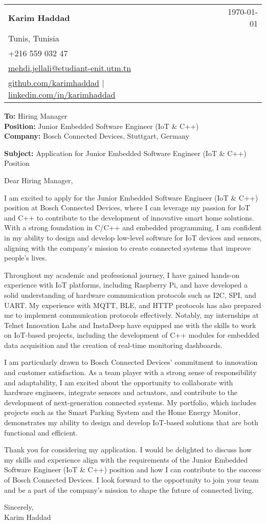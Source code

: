 \documentclass[letterpaper,11pt]{article}
\makeatletter
\newcommand{\letterHeading}[5]{
    \begin{tabular*}{\textwidth}{l@{\extracolsep{\fill}}r}
    \textbf{\Large #1} & #5 \\  %
    #2 & \\
    #3 & \\
    #4 & \\
    \end{tabular*}
    \vspace{15pt}
}
\newcommand{\letterRecipient}[3]{
    \textbf{\large To:} #1 \\
    \textbf{\large Position:} #2 \\
    \textbf{\large Company:} #3 \\
    \vspace{12pt}
}
\newcommand{\letterSubject}[1]{
    \textbf{\large Subject:} #1 \\
    \vspace{15pt}
}
\makeatother
\begin{document}
    \letterHeading
    {Karim Haddad}
    {Tunis, Tunisia}
    {+216 559 032 47 \\ \href{mailto:mehdi.jellali@etudiant-enit.utm.tn}{mehdi.jellali@etudiant-enit.utm.tn}}
    {\href{https://github.com/karimhaddad}{github.com/karimhaddad} $|$ \href{https://www.linkedin.com/in/karimhaddad}{linkedin.com/in/karimhaddad}}
    {\today}

    \letterRecipient
    {Hiring Manager}
    {Junior Embedded Software Engineer (IoT & C++)}
    {Bosch Connected Devices, Stuttgart, Germany}

    \letterSubject{Application for Junior Embedded Software Engineer (IoT & C++) Position}

    Dear Hiring Manager,

    I am excited to apply for the Junior Embedded Software Engineer (IoT & C++) position at Bosch Connected Devices, where I can leverage my passion for IoT and C++ to contribute to the development of innovative smart home solutions. With a strong foundation in C/C++ and embedded programming, I am confident in my ability to design and develop low-level software for IoT devices and sensors, aligning with the company's mission to create connected systems that improve people's lives.

    Throughout my academic and professional journey, I have gained hands-on experience with IoT platforms, including Raspberry Pi, and have developed a solid understanding of hardware communication protocols such as I2C, SPI, and UART. My experience with MQTT, BLE, and HTTP protocols has also prepared me to implement communication protocols effectively. Notably, my internships at Telnet Innovation Labs and InstaDeep have equipped me with the skills to work on IoT-based projects, including the development of C++ modules for embedded data acquisition and the creation of real-time monitoring dashboards.

    I am particularly drawn to Bosch Connected Devices' commitment to innovation and customer satisfaction. As a team player with a strong sense of responsibility and adaptability, I am excited about the opportunity to collaborate with hardware engineers, integrate sensors and actuators, and contribute to the development of next-generation connected systems. My portfolio, which includes projects such as the Smart Parking System and the Home Energy Monitor, demonstrates my ability to design and develop IoT-based solutions that are both functional and efficient.

    Thank you for considering my application. I would be delighted to discuss how my skills and experience align with the requirements of the Junior Embedded Software Engineer (IoT & C++) position and how I can contribute to the success of Bosch Connected Devices. I look forward to the opportunity to join your team and be a part of the company's mission to shape the future of connected living.

    Sincerely,\\[12pt]

    Karim Haddad
\end{document}
